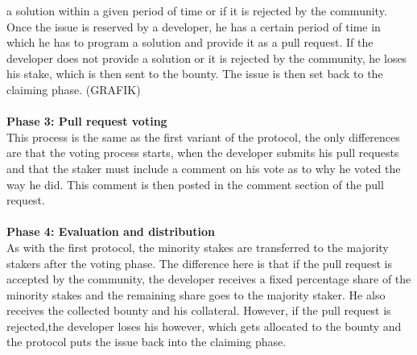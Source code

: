 \documentclass[sigconf]{acmart}
\begin{document}
a solution within a given period of time or if it is rejected by the community. Once the issue is reserved by a developer, 
he has a certain period of time in which he has to program a solution and provide it as a pull request. If the developer does not 
provide a solution or it is rejected by the community, he loses his stake, which is then sent to the bounty. The issue is then set back 
to the claiming phase. (GRAFIK)\\ \\
\textbf{Phase 3: Pull request voting} \\
This process is the same as the first variant of the protocol, the only differences are that the voting process starts, when 
the developer submits his pull requests and that the staker must include a comment on his 
vote as to why he voted the way he did. This comment is then posted in the comment section of the pull request. \\ \\
\textbf{Phase 4: Evaluation and distribution} \\
As with the first protocol, the minority stakes are transferred to the majority stakers after the voting phase. The difference 
here is that if the pull request is accepted by the community, the developer receives a fixed percentage share of the minority
stakes and the remaining share goes to the majority staker. He also receives the collected bounty and his collateral. However, 
if the pull request is rejected,the developer loses his however, which gets allocated to the bounty and the protocol puts the issue 
back into the claiming phase.
\end{document}
